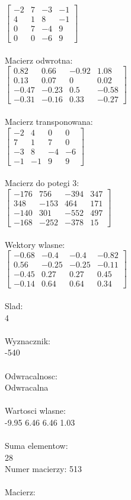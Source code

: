 \documentclass[a4paper,12pt]{article}
\begin{document}
$\begin{bmatrix} -2&7&-3&-1\\4&1&8&-1\\0&7&-4&9\\0&0&-6&9 \end{bmatrix}$
\\
\\
Macierz odwrotna:\\

$\begin{bmatrix} 0.82&0.66&-0.92&1.08\\0.13&0.07&0&0.02\\-0.47&-0.23&0.5&-0.58\\-0.31&-0.16&0.33&-0.27 \end{bmatrix}$
\\
\\
Macierz transponowana:\\

$\begin{bmatrix} -2&4&0&0\\7&1&7&0\\-3&8&-4&-6\\-1&-1&9&9 \end{bmatrix}$
\\
\\
Macierz do potegi 3:\\

$\begin{bmatrix} -176&756&-394&347\\348&-153&464&171\\-140&301&-552&497\\-168&-252&-378&15 \end{bmatrix}$
\\
\\
Wektory wlasne:\\

$\begin{bmatrix} -0.68&-0.4&-0.4&-0.82\\0.56&-0.25&-0.25&-0.11\\-0.45&0.27&0.27&0.45\\-0.14&0.64&0.64&0.34 \end{bmatrix}$
\\
\\
Slad:\\
4
\\
\\
Wyznacznik:\\
-540
\\
\\
Odwracalnosc:\\
Odwracalna
\\
\\
Wartosci wlasne:\\
-9.95 6.46 6.46 1.03
\\
\\
Suma elementow:\\
28
\\
\newpage
Numer macierzy:
513
\\
\\
Macierz:\\
\end{document}
